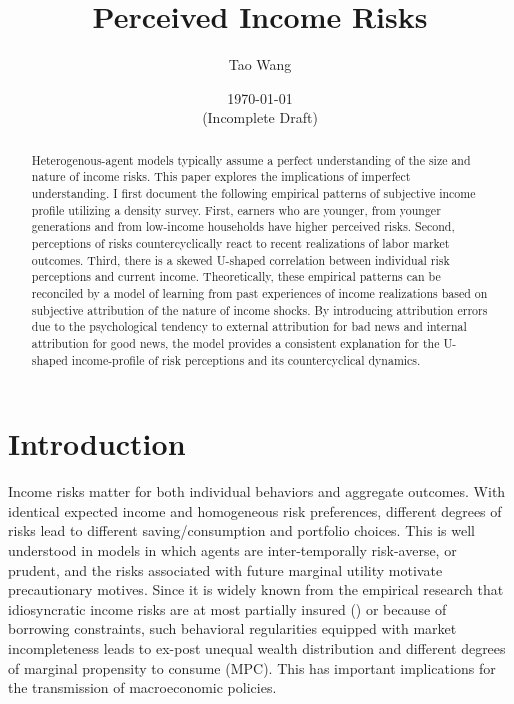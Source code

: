 \documentclass[12pt,notitlepage,onecolumn,aps,pra]{article}
\begin{document}
    
    \title{Perceived Income Risks}\author{Tao Wang}

\date{\today \\{(Incomplete Draft)}}
\maketitle\begin{abstract}Heterogenous-agent models typically assume a perfect understanding of the size and nature of income risks. This paper explores the implications of imperfect understanding. I first document the following empirical patterns of subjective income profile utilizing a density survey. First, earners who are younger, from younger generations and from low-income households have higher perceived risks. Second, perceptions of risks countercyclically react to recent realizations of labor market outcomes. Third, there is a skewed U-shaped correlation between individual risk perceptions and current income. Theoretically, these empirical patterns can be reconciled by a model of learning from past experiences of income realizations based on subjective attribution of the nature of income shocks. By introducing attribution errors due to the psychological tendency to external attribution for bad news and internal attribution for good news, the model provides a consistent explanation for the U-shaped income-profile of risk perceptions and its countercyclical dynamics.\end{abstract}


    
    

    
    \hypertarget{introduction}{%
\section{Introduction}\label{introduction}}

Income risks matter for both individual behaviors and aggregate
outcomes. With identical expected income and homogeneous risk
preferences, different degrees of risks lead to different
saving/consumption and portfolio choices. This is well understood in
models in which agents are inter-temporally risk-averse, or prudent, and
the risks associated with future marginal utility motivate precautionary
motives. Since it is widely known from the empirical research that
idiosyncratic income risks are at most partially insured
(\cite{blundell_consumption_2008}) or because of borrowing constraints,
such behavioral regularities equipped with market incompleteness leads
to ex-post unequal wealth distribution and different degrees of marginal
propensity to consume (MPC). This has important implications for the
transmission of macroeconomic policies.
\end{document}
